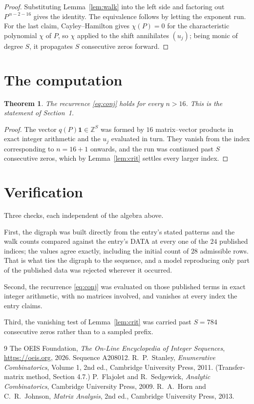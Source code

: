 \documentclass[11pt,a4paper]{article}
\theoremstyle{plain}
\newtheorem{theorem}{Theorem}
\theoremstyle{definition}
\begin{document}
\begin{proof}
Substituting Lemma~\ref{lem:walk} into the left side and factoring out
$P^{\,n-2-16}$ gives the identity. The equivalence follows by letting the exponent
run. For the last claim, Cayley--Hamilton gives $\chi(P)=0$ for the characteristic
polynomial $\chi$ of $P$, so $\chi$ applied to the shift annihilates $(u_j)$; being monic of
degree $S$, it propagates $S$ consecutive zeros forward.
\end{proof}

\section{The computation}

\begin{theorem}
The recurrence \eqref{eq:conj} holds for every $n>16$. This is the statement of
Section~1.
\end{theorem}

\begin{proof}
The vector $q(P)\mathbf{1}\in\mathbb{Z}^{S}$ was formed by $16$ matrix--vector
products in exact integer arithmetic and the $u_j$ evaluated in turn. They vanish from the
index corresponding to $n=16+1$ onwards, and the run was continued past $S$ consecutive
zeros, which by Lemma~\ref{lem:crit} settles every larger index.
\end{proof}

\section{Verification}

Three checks, each independent of the algebra above.

First, the digraph was built directly from the entry's stated patterns and the walk counts
compared against the entry's DATA at every one of the $24$ published indices; the
values agree exactly, including the initial count of $28$ admissible rows. That is
what ties the digraph to the sequence, and a model reproducing only part of the published
data was rejected wherever it occurred.

Second, the recurrence \eqref{eq:conj} was evaluated on those published terms in exact
integer arithmetic, with no matrices involved, and vanishes at every index the entry claims.

Third, the vanishing test of Lemma~\ref{lem:crit} was carried past $S=784$ consecutive
zeros rather than to a sampled prefix.

\begin{thebibliography}{9}
 The OEIS Foundation, \emph{The On-Line Encyclopedia of Integer
Sequences}, \url{https://oeis.org}, 2026. Sequence A208012.
 R.~P.~Stanley, \emph{Enumerative Combinatorics}, Volume 1, 2nd ed.,
Cambridge University Press, 2011. (Transfer-matrix method, Section 4.7.)
 P.~Flajolet and R.~Sedgewick, \emph{Analytic Combinatorics}, Cambridge
University Press, 2009.
 R.~A.~Horn and C.~R.~Johnson, \emph{Matrix Analysis}, 2nd ed., Cambridge
University Press, 2013.
\end{thebibliography}
\end{document}
